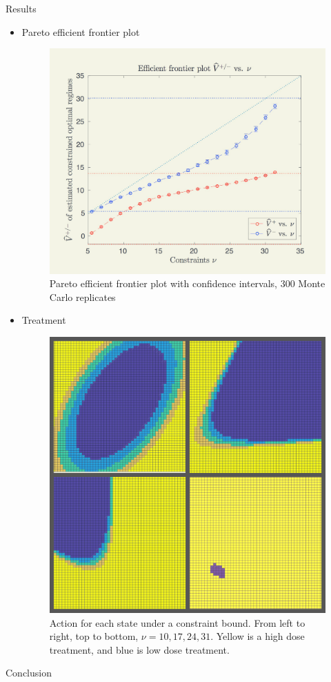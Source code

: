 \documentclass[final,hyperref={pdfpagelabels=false}]{beamer}
\begin{document}
\begin{frame}[t]
\begin{columns}[t]
\begin{column}{.465\textwidth}
\begin{block}{Results}
\begin{itemize}
\item Pareto efficient frontier plot
\begin{figure}
\includegraphics[width=0.7\linewidth]{efficient_plot.png}
\caption{Pareto efficient frontier plot with confidence intervals, 300 Monte Carlo replicates}
\end{figure}
\item Treatment
\begin{figure}
\includegraphics[width=0.5\linewidth]{act_dark.jpg}
\caption{Action for each state under a constraint bound. From left to right, top to bottom, $\nu= 10, 17, 24, 31$. Yellow is a high dose treatment, and blue is low dose treatment.}
\end{figure}
\end{itemize}     
\end{block}



\begin{block}{Conclusion}


\end{block}
\end{column}
\end{columns}
\end{frame}
\end{document}
